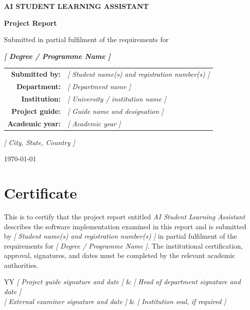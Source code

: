 \documentclass[12pt,a4paper,oneside]{report}
\numberwithin{equation}{chapter}
\newcommand{\placeholder}[1]{\textit{[ #1 ]}}
\begin{document}
\begin{titlepage}
  \centering
  \vspace*{1.3in}
  {\bfseries\fontsize{20}{24}\selectfont AI STUDENT LEARNING ASSISTANT\par}
  \vspace{0.35in}
  {\bfseries\fontsize{16}{20}\selectfont Project Report\par}
  \vspace{0.7in}
  {\large Submitted in partial fulfilment of the requirements for\par}
  \vspace{0.15in}
  {\large\bfseries \placeholder{Degree / Programme Name}\par}
  \vspace{0.75in}
  \begin{tabular}{rl}
    \textbf{Submitted by:} & \placeholder{Student name(s) and registration number(s)}\\[0.35em]
    \textbf{Department:} & \placeholder{Department name}\\[0.35em]
    \textbf{Institution:} & \placeholder{University / institution name}\\[0.35em]
    \textbf{Project guide:} & \placeholder{Guide name and designation}\\[0.35em]
    \textbf{Academic year:} & \placeholder{Academic year}
  \end{tabular}
  \vfill
  {\large \placeholder{City, State, Country}\par}
  \vspace{0.15in}
  {\large \today\par}
\end{titlepage}

\chapter*{Certificate}
This is to certify that the project report entitled \textit{AI Student Learning Assistant} describes the software implementation examined in this report and is submitted by \placeholder{Student name(s) and registration number(s)} in partial fulfilment of the requirements for \placeholder{Degree / Programme Name}. The institutional certification, approval, signatures, and dates must be completed by the relevant academic authorities.

\vspace{1.2in}
\noindent
\begin{tabularx}{\textwidth}{YY}
\placeholder{Project guide signature and date} & \placeholder{Head of department signature and date}\\[1.1in]
\placeholder{External examiner signature and date} & \placeholder{Institution seal, if required}
\end{tabularx}
\end{document}
